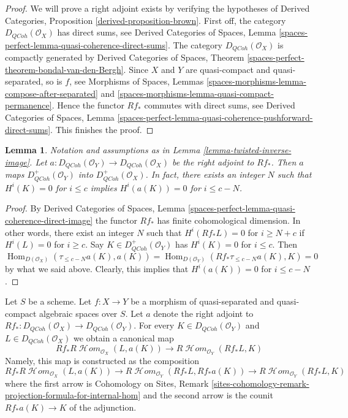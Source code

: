 \documentclass{stacks-project}
\theoremstyle{plain}
\newtheorem{lemma}[subsection]{Lemma}
\theoremstyle{definition}
\theoremstyle{remark}
\numberwithin{equation}{subsection}
\def\Hom{\mathop{\mathrm{Hom}}\nolimits}
\def\SheafHom{\mathop{\mathcal{H}\!\mathit{om}}\nolimits}
\def\QCoh{\mathit{QCoh}}
\begin{document}
\begin{proof}
We will prove a right adjoint exists by verifying the hypotheses of
Derived Categories, Proposition \ref{derived-proposition-brown}.
First off, the category $D_\QCoh(\mathcal{O}_X)$ has direct sums, see
Derived Categories of Spaces, Lemma
\ref{spaces-perfect-lemma-quasi-coherence-direct-sums}.
The category $D_\QCoh(\mathcal{O}_X)$ is compactly generated by
Derived Categories of Spaces, Theorem
\ref{spaces-perfect-theorem-bondal-van-den-Bergh}.
Since $X$ and $Y$ are quasi-compact and quasi-separated, so is $f$, see
Morphisms of Spaces, Lemmas
\ref{spaces-morphisms-lemma-compose-after-separated} and
\ref{spaces-morphisms-lemma-quasi-compact-permanence}.
Hence the functor $Rf_*$ commutes with direct sums, see
Derived Categories of Spaces, Lemma
\ref{spaces-perfect-lemma-quasi-coherence-pushforward-direct-sums}.
This finishes the proof.
\end{proof}

\begin{lemma}
\label{lemma-twisted-inverse-image-bounded-below}
Notation and assumptions as in Lemma \ref{lemma-twisted-inverse-image}.
Let $a : D_\QCoh(\mathcal{O}_Y) \to D_\QCoh(\mathcal{O}_X)$ be the right
adjoint to $Rf_*$. Then $a$ maps
$D^+_\QCoh(\mathcal{O}_Y)$ into $D^+_\QCoh(\mathcal{O}_X)$.
In fact, there exists an integer $N$ such that
$H^i(K) = 0$ for $i \leq c$ implies $H^i(a(K)) = 0$ for $i \leq c - N$.
\end{lemma}

\begin{proof}
By Derived Categories of Spaces, Lemma
\ref{spaces-perfect-lemma-quasi-coherence-direct-image}
the functor $Rf_*$ has finite cohomological dimension. In other words,
there exist an integer $N$ such that
$H^i(Rf_*L) = 0$ for $i \geq N + c$ if $H^i(L) = 0$ for $i \geq c$.
Say $K \in D^+_\QCoh(\mathcal{O}_Y)$ has $H^i(K) = 0$ for $i \leq c$.
Then
$$
\Hom_{D(\mathcal{O}_X)}(\tau_{\leq c - N}a(K), a(K)) =
\Hom_{D(\mathcal{O}_Y)}(Rf_*\tau_{\leq c - N}a(K), K) = 0
$$
by what we said above. Clearly, this implies that
$H^i(a(K)) = 0$ for $i \leq c - N$.
\end{proof}

\noindent
Let $S$ be a scheme.
Let $f : X \to Y$ be a morphism of quasi-separated and quasi-compact
algebraic spaces over $S$.
Let $a$ denote the right adjoint to
$Rf_* : D_\QCoh(\mathcal{O}_X) \to D_\QCoh(\mathcal{O}_Y)$. For every
$K \in D_\QCoh(\mathcal{O}_Y)$ and $L \in D_\QCoh(\mathcal{O}_X)$
we obtain a canonical map
\begin{equation}
\label{equation-sheafy-trace}
Rf_*R\SheafHom_{\mathcal{O}_X}(L, a(K))
\longrightarrow
R\SheafHom_{\mathcal{O}_Y}(Rf_*L, K)
\end{equation}
Namely, this map is constructed as the composition
$$
Rf_*R\SheafHom_{\mathcal{O}_X}(L, a(K)) \to
R\SheafHom_{\mathcal{O}_Y}(Rf_*L, Rf_*a(K)) \to
R\SheafHom_{\mathcal{O}_Y}(Rf_*L, K)
$$
where the first arrow is 
Cohomology on Sites, Remark
\ref{sites-cohomology-remark-projection-formula-for-internal-hom}
and the second arrow is the counit $Rf_*a(K) \to K$ of the adjunction.
\end{document}

